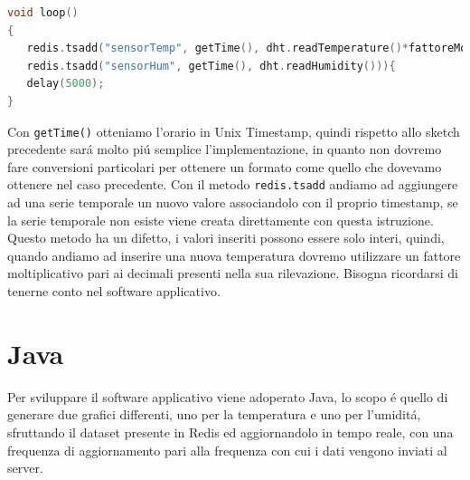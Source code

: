 \begin{enumerate}
\begin{lstlisting}[autogobble, style=c, language=C]
void loop()
{
   redis.tsadd("sensorTemp", getTime(), dht.readTemperature()*fattoreMoltiplicativoTemp))
   redis.tsadd("sensorHum", getTime(), dht.readHumidity())){
   delay(5000);
}\end{lstlisting}

    Con \texttt{getTime()} otteniamo l'orario in Unix Timestamp, quindi rispetto allo sketch precedente
    sará molto piú semplice l'implementazione, in quanto non dovremo fare conversioni particolari per ottenere
    un formato come quello che dovevamo ottenere nel caso precedente.
    Con il metodo \texttt{redis.tsadd} andiamo ad aggiungere ad una serie temporale un nuovo valore associandolo con il proprio timestamp,
    se la serie temporale non esiste viene creata direttamente con questa istruzione.
    Questo metodo ha un difetto, i valori inseriti possono essere solo interi, quindi, quando andiamo ad inserire
    una nuova temperatura dovremo utilizzare un fattore moltiplicativo pari ai decimali presenti nella sua rilevazione.
    Bisogna ricordarsi di tenerne conto nel software applicativo.
\end{enumerate}


\section{Java}
Per sviluppare il software applicativo viene adoperato Java, lo scopo é quello di generare due grafici differenti,
uno per la temperatura e uno per l'umiditá, sfruttando il dataset presente in Redis ed aggiornandolo in tempo reale, con
una frequenza di aggiornamento pari alla frequenza con cui i dati vengono inviati al server.

